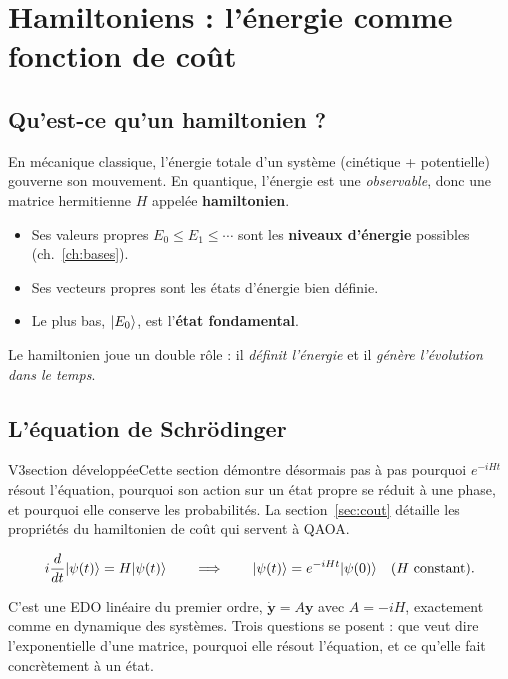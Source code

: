 \chapter{Hamiltoniens : l'énergie comme fonction de coût}\label{ch:hamiltoniens}

\section{Qu'est-ce qu'un hamiltonien ?}
En mécanique classique, l'énergie totale d'un système (cinétique + potentielle) gouverne son mouvement. En quantique, l'énergie est une \emph{observable}, donc une matrice hermitienne $H$ appelée \textbf{hamiltonien}.
\begin{itemize}
\item Ses valeurs propres $E_0\le E_1\le\cdots$ sont les \textbf{niveaux d'énergie} possibles (ch.~\ref{ch:bases}).
\item Ses vecteurs propres sont les états d'énergie bien définie.
\item Le plus bas, $\lvert E_0\rangle$, est l'\textbf{état fondamental}.
\end{itemize}
Le hamiltonien joue un double rôle : il \emph{définit l'énergie} et il \emph{génère l'évolution dans le temps}.

\section{L'équation de Schrödinger}\label{sec:schrodinger}
\begin{evolution}{V3}{section développée}Cette section démontre désormais pas à pas pourquoi $e^{-iHt}$ résout l'équation, pourquoi son action sur un état propre se réduit à une phase, et pourquoi elle conserve les probabilités. La section~\ref{sec:cout} détaille les propriétés du hamiltonien de coût qui servent à QAOA.\end{evolution}

\begin{definition}
\[ i\frac{d}{dt}\lvert \psi(t)\rangle=H\lvert \psi(t)\rangle\qquad\Longrightarrow\qquad \lvert \psi(t)\rangle=e^{-iHt}\lvert \psi(0)\rangle\quad(H\text{ constant}). \]
\end{definition}
C'est une EDO linéaire du premier ordre, $\dot{\mathbf y}=A\mathbf y$ avec $A=-iH$, exactement comme en dynamique des systèmes. Trois questions se posent : que veut dire l'exponentielle d'une matrice, pourquoi elle résout l'équation, et ce qu'elle fait concrètement à un état.

